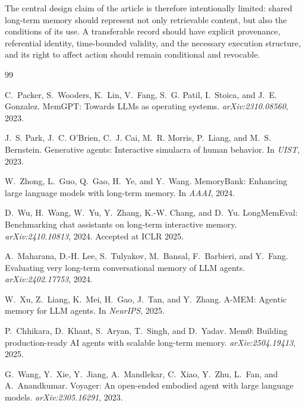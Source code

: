 \documentclass{article}
\begin{document}
The central design claim of the article is therefore intentionally limited: shared long-term memory should represent not only retrievable content, but also the conditions of its use. A transferable record should have explicit provenance, referential identity, time-bounded validity, and the necessary execution structure, and its right to affect action should remain conditional and revocable.

\FloatBarrier
\begin{thebibliography}{99}

C.~Packer, S.~Wooders, K.~Lin, V.~Fang, S.~G. Patil, I.~Stoica, and J.~E. Gonzalez.
\newblock MemGPT: Towards LLMs as operating systems.
\newblock \emph{arXiv:2310.08560}, 2023.

J.~S. Park, J.~C. O'Brien, C.~J. Cai, M.~R. Morris, P.~Liang, and M.~S. Bernstein.
\newblock Generative agents: Interactive simulacra of human behavior.
\newblock In \emph{UIST}, 2023.

W.~Zhong, L.~Guo, Q.~Gao, H.~Ye, and Y.~Wang.
\newblock MemoryBank: Enhancing large language models with long-term memory.
\newblock In \emph{AAAI}, 2024.

D.~Wu, H.~Wang, W.~Yu, Y.~Zhang, K.-W. Chang, and D.~Yu.
\newblock LongMemEval: Benchmarking chat assistants on long-term interactive memory.
\newblock \emph{arXiv:2410.10813}, 2024. Accepted at ICLR 2025.

A.~Maharana, D.-H. Lee, S.~Tulyakov, M.~Bansal, F.~Barbieri, and Y.~Fang.
\newblock Evaluating very long-term conversational memory of LLM agents.
\newblock \emph{arXiv:2402.17753}, 2024.

W.~Xu, Z.~Liang, K.~Mei, H.~Gao, J.~Tan, and Y.~Zhang.
\newblock A-MEM: Agentic memory for LLM agents.
\newblock In \emph{NeurIPS}, 2025.

P.~Chhikara, D.~Khant, S.~Aryan, T.~Singh, and D.~Yadav.
\newblock Mem0: Building production-ready AI agents with scalable long-term memory.
\newblock \emph{arXiv:2504.19413}, 2025.

G.~Wang, Y.~Xie, Y.~Jiang, A.~Mandlekar, C.~Xiao, Y.~Zhu, L.~Fan, and A.~Anandkumar.
\newblock Voyager: An open-ended embodied agent with large language models.
\newblock \emph{arXiv:2305.16291}, 2023.


\end{thebibliography}
\end{document}
